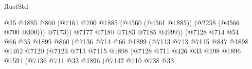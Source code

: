\begin{lexlean}{RustStd}
\begin{coremodule}
                                              @35
                                              @1885
                                              @860
                                              (@7161
                                                @700
                                                @1885
                                                (@4560 (@4561 @1885))
                                                (@2258 (@4566 @700 @300)))
                                              @7173))
                                          @7177
                                          @7180
                                          @7183
                                          @7185
                                          @4999))
                                      (@7128
                                        @714
                                        @54
                                        @66
                                        @35
                                        @1899
                                        @860
                                        (@7136
                                          @714
                                          @66
                                          @1899
                                          (@7113
                                            @713
                                            @7115
                                            @847
                                            @1898
                                            @1462
                                            @7120
                                            (@7123
                                              @713
                                              @7115
                                              @1898
                                              (@7128
                                                @711
                                                @426
                                                @33
                                                @198
                                                @1896
                                                @1591
                                                (@7136
                                                  @711
                                                  @33
                                                  @1896
                                                  (@7142
                                                    @710
                                                    @738
                                                    @33

\end{coremodule}
\end{lexlean}
